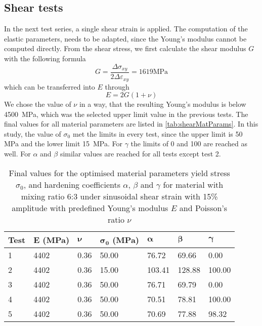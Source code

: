 \subsection{Shear tests}
In the next test series, a single shear strain is applied. The computation of the elastic parameters, needs to be adapted, since the Young's modulus cannot be computed directly. From the shear stress, we first calculate the shear modulus $G$ with the following formula
\begin{equation}
    G = \frac{\Delta\sigma_{xy}}{2\Delta\varepsilon_{xy}} = 1619 \text{MPa}
\end{equation}
which can be transferred into $E$ through
\begin{equation}
    E = 2G(1+\nu) 
\end{equation}
We chose the value of $\nu$ in a way, that the resulting Young's modulus is below 4500 MPa, which was the selected upper limit value in the previous tests. The final values for all material parameters are listed in \autoref{tab:shearMatParams}. In this study, the value of $\sigma_0$ met the limits in every test, since the upper limit is 50 MPa and the lower limit 15 MPa. For $\gamma$ the limits of 0 and 100 are reached as well. For $\alpha$ and $\beta$ similar values are reached for all tests except test 2. 

\begin{table}[h!]
\centering
\caption{Final values for the optimised material parameters yield stress $\sigma_0$, and hardening coefficients $\alpha$, $\beta$ and $\gamma$ for material with mixing ratio 6:3 under sinusoidal shear strain with 15\%  amplitude with predefined Young's modulus $E$ and Poisson's ratio $\nu$}
\label{tab:shearMatParams}
\renewcommand{\arraystretch}{1.1}
\begin{tabular}{L{0.08\textwidth}|C{0.08\textwidth}C{0.08\textwidth}C{0.08\textwidth}C{0.08\textwidth}C{0.08\textwidth}C{0.08\textwidth}}
\toprule
\textbf{Test} & \textbf{E (MPa)} & $\boldsymbol{\nu}$ & $\boldsymbol{\sigma_0}$ \textbf{(MPa)} & $\boldsymbol{\alpha}$ & $\boldsymbol{\beta}$ & $\boldsymbol{\gamma}$ \\
 & 4402 & 0.36 & 50.00 & 76.72 & 69.66 & 0.00 \\
2 & 4402 & 0.36 & 15.00 & 103.41 & 128.88 & 100.00 \\
3 & 4402 & 0.36 & 50.00 & 76.71 & 69.79 & 0.00 \\
4 & 4402 & 0.36 & 50.00 & 70.51 & 78.81 & 100.00  \\
5 & 4402 & 0.36 & 50.00 & 70.69 & 77.88 & 98.32 \\
\bottomrule
\end{tabular}
\end{table}

